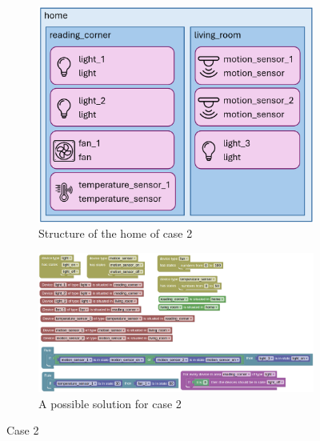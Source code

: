\documentclass[11pt,a4paper]{report}
\begin{document}
\begin{figure}[htbp]
    \centering
    \begin{subfigure}[b]{0.6\linewidth}
        \centering
        \includegraphics[width=\linewidth]{images/case_2.png}
        \caption{Structure of the home of case 2}
        \label{fig:case_2}
    \end{subfigure}
    \hfill
    \begin{subfigure}[b]{1\linewidth}
        \centering
        \includegraphics[width=\linewidth]{images/case_2_homy.png}
        \caption{A possible solution for case 2}
        \label{fig:case_2_solution}
    \end{subfigure}
    \caption{Case 2}
    \label{fig:CASE_2}
\end{figure}
\end{document}
